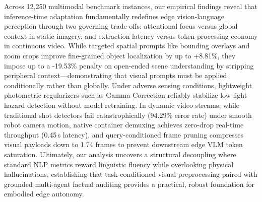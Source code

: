 Across 12,250 multimodal benchmark instances, our empirical findings reveal that inference-time adaptation fundamentally redefines edge vision-language perception through two governing trade-offs: attentional focus versus global context in static imagery, and extraction latency versus token processing economy in continuous video. While targeted spatial prompts like bounding overlays and zoom crops improve fine-grained object localization by up to +8.81\%, they impose up to a -19.53\% penalty on open-ended scene understanding by stripping peripheral context---demonstrating that visual prompts must be applied conditionally rather than globally. Under adverse sensing conditions, lightweight photometric regularizers such as Gamma Correction reliably stabilize low-light hazard detection without model retraining. In dynamic video streams, while traditional shot detectors fail catastrophically (94.29\% error rate) under smooth robot camera motion, native container demuxing achieves zero-drop real-time throughput (0.45\,s latency), and query-conditioned frame pruning compresses visual payloads down to 1.74 frames to prevent downstream edge VLM token saturation. Ultimately, our analysis uncovers a structural decoupling where standard NLP metrics reward linguistic fluency while overlooking physical hallucinations, establishing that task-conditioned visual preprocessing paired with grounded multi-agent factual auditing provides a practical, robust foundation for embodied edge autonomy.